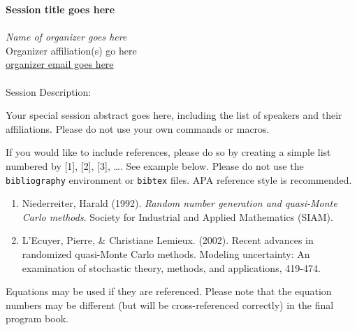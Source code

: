 \documentclass[12pt,a4paper,figuresright]{book}
\newenvironment{session}[7] %
 {%
  \vskip 0pt\nopagebreak%
  \textbf{#1}\vspace{3mm}\\\nopagebreak%
  \ifthenelse{\equal{#5}{ }}{Organizer:}{Organizers:}\vspace{2mm}\\\nopagebreak%
  \textit{#2}\\\nopagebreak%
  #3\\\nopagebreak%
  \url{#4}\vspace{3mm}\\\nopagebreak%
  \ifthenelse{\equal{#5}{ }}{}{\textit{#5}\\\nopagebreak%
                              #6\\\nopagebreak%
                              \url{#7}\vspace{3mm}\\\nopagebreak}%
  \quad\\\nopagebreak%
  Session Description:\vspace{3mm}\\\nopagebreak%
 }
 {\nopagebreak}%
\begin{document}
	
\begin{session}
  {Session title goes here}%
  {Name of organizer goes here}%
  {Organizer affiliation(s) go here}%
  {organizer email goes here}%
  { }%
  { }%
  { }%

Your special session abstract goes here, including the list of speakers and their affiliations. Please do not use your own commands or macros.

\medskip

If you would like to include references, please do so by creating a simple list numbered by [1], [2], [3], \ldots. See example below.
Please do not use the \texttt{bibliography} environment or \texttt{bibtex} files.
APA reference style is recommended.
\begin{enumerate}
	\item[{[1]}] Niederreiter, Harald (1992). {\it Random number generation and quasi-Monte Carlo methods}. Society for Industrial and Applied Mathematics (SIAM).
	\item[{[2]}] L’Ecuyer, Pierre, \& Christiane Lemieux. (2002). Recent advances in randomized quasi-Monte Carlo methods. Modeling uncertainty: An examination of stochastic theory, methods, and applications, 419-474.
\end{enumerate}

Equations may be used if they are referenced. Please note that the equation numbers may be different (but will be cross-referenced correctly) in the final program book.
  
\end{session}
\end{document}
